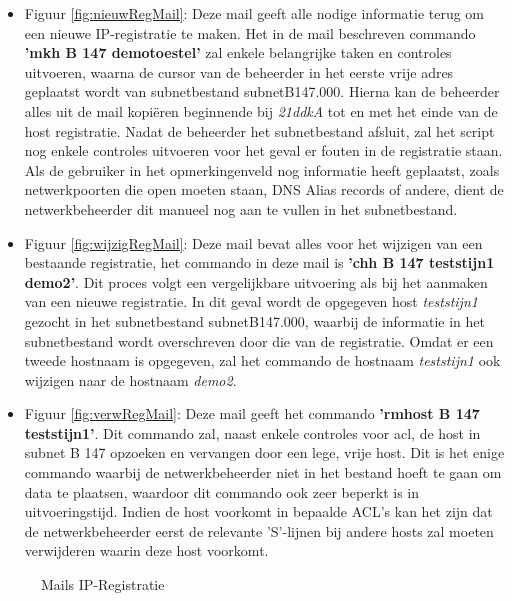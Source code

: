 \begin{itemize}
    \item Figuur \ref{fig:nieuwRegMail}: Deze mail geeft alle nodige informatie terug om een nieuwe IP-registratie te maken. Het in de mail beschreven commando \textbf{'mkh B 147 demotoestel'} zal enkele belangrijke taken en controles uitvoeren, waarna de cursor van de beheerder in het eerste vrije adres geplaatst wordt van subnetbestand subnetB147.000. Hierna kan de beheerder alles uit de mail kopiëren beginnende bij \textit{21ddkA} tot en met het einde van de host registratie. Nadat de beheerder het subnetbestand afsluit, zal het script nog enkele controles uitvoeren voor het geval er fouten in de registratie staan. Als de gebruiker in het opmerkingenveld nog informatie heeft geplaatst, zoals netwerkpoorten die open moeten staan, DNS Alias records of andere, dient de netwerkbeheerder dit manueel nog aan te vullen in het subnetbestand.
    \item Figuur \ref{fig:wijzigRegMail}: Deze mail bevat alles voor het wijzigen van een bestaande registratie, het commando in deze mail is \textbf{'chh B 147 teststijn1 demo2'}. Dit proces volgt een vergelijkbare uitvoering als bij het aanmaken van een nieuwe registratie. In dit geval wordt de opgegeven host \textit{teststijn1} gezocht in het subnetbestand subnetB147.000, waarbij de informatie in het subnetbestand wordt overschreven door die van de registratie. Omdat er een tweede hostnaam is opgegeven, zal het commando de hostnaam \textit{teststijn1} ook wijzigen naar de hostnaam \textit{demo2}.
    \item Figuur \ref{fig:verwRegMail}: Deze mail geeft het commando \textbf{'rmhost B 147 teststijn1'}. Dit commando zal, naast enkele controles voor \acrshort{acl}, de host in subnet B 147 opzoeken en vervangen door een lege, vrije host. Dit is het enige commando waarbij de netwerkbeheerder niet in het bestand hoeft te gaan om data te plaatsen, waardoor dit commando ook zeer beperkt is in uitvoeringstijd. Indien de host voorkomt in bepaalde ACL's kan het zijn dat de netwerkbeheerder eerst de relevante 'S'-lijnen bij andere hosts zal moeten verwijderen waarin deze host voorkomt.
\end{itemize}

\begin{figure}[H]
    \hspace*{\fill}
    \hspace*{\fill}
    \caption{Mails IP-Registratie}
    \label{fig:netadminMail}
\end{figure}


